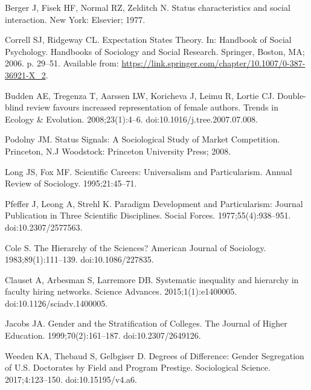 \documentclass[10pt,letterpaper]{article}
\begin{document}
\begin{thebibliography}{100}
Berger J, Fisek HF, Normal RZ, Zelditch N.
\newblock Status characteristics and social interaction.
\newblock New York: Elsevier; 1977.

Correll SJ, Ridgeway CL.
\newblock Expectation {States} {Theory}.
\newblock In: Handbook of {Social} {Psychology}. Handbooks of {Sociology} and
  {Social} {Research}. Springer, Boston, MA; 2006. p. 29--51.
\newblock Available from:
  \url{https://link.springer.com/chapter/10.1007/0-387-36921-X_2}.

Budden AE, Tregenza T, Aarssen LW, Koricheva J, Leimu R, Lortie CJ.
\newblock Double-blind review favours increased representation of female
  authors.
\newblock Trends in Ecology \& Evolution. 2008;23(1):4--6.
\newblock doi:{10.1016/j.tree.2007.07.008}.

Podolny JM.
\newblock Status {Signals}: {A} {Sociological} {Study} of {Market}
  {Competition}.
\newblock Princeton, N.J Woodstock: Princeton University Press; 2008.

Long JS, Fox MF.
\newblock Scientific {Careers}: {Universalism} and {Particularism}.
\newblock Annual Review of Sociology. 1995;21:45--71.

Pfeffer J, Leong A, Strehl K.
\newblock Paradigm {Development} and {Particularism}: {Journal} {Publication}
  in {Three} {Scientific} {Disciplines}.
\newblock Social Forces. 1977;55(4):938--951.
\newblock doi:{10.2307/2577563}.

Cole S.
\newblock The {Hierarchy} of the {Sciences}?
\newblock American Journal of Sociology. 1983;89(1):111--139.
\newblock doi:{10.1086/227835}.

Clauset A, Arbesman S, Larremore DB.
\newblock Systematic inequality and hierarchy in faculty hiring networks.
\newblock Science Advances. 2015;1(1):e1400005.
\newblock doi:{10.1126/sciadv.1400005}.

Jacobs JA.
\newblock Gender and the {Stratification} of {Colleges}.
\newblock The Journal of Higher Education. 1999;70(2):161--187.
\newblock doi:{10.2307/2649126}.

Weeden KA, Thebaud S, Gelbgiser D.
\newblock Degrees of {Difference}: {Gender} {Segregation} of {U}.{S}.
  {Doctorates} by {Field} and {Program} {Prestige}.
\newblock Sociological Science. 2017;4:123--150.
\newblock doi:{10.15195/v4.a6}.


\end{thebibliography}
\end{document}
